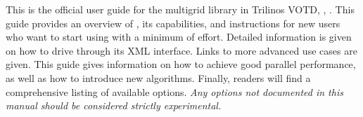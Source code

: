 
This is the official user guide for the \muelu{} multigrid library in Trilinos VOTD,
\monthWord, \the\year. This guide provides an overview of \muelu, its capabilities, and
instructions for new users who want to start using \muelu{} with a minimum of
effort. Detailed information is given on how to drive \muelu{} through its XML
interface. Links to more advanced use cases are given. This guide gives
information on how to achieve good parallel performance, as well as how to
introduce new algorithms. Finally, readers will find a comprehensive listing of
available \muelu{} options.  {\em Any options not documented in this manual
should be considered strictly experimental.}

